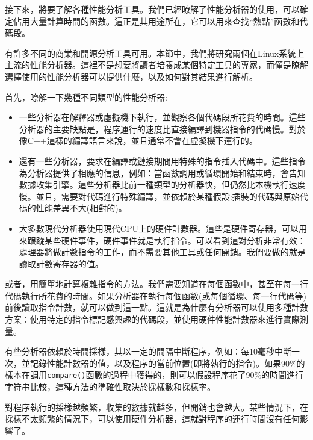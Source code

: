 
接下來，將要了解各種性能分析工具。我們已經瞭解了性能分析器的使用，可以確定佔用大量計算時間的函數。這正是其用途所在，它可以用來查找“熱點”函數和代碼段。

有許多不同的商業和開源分析工具可用。本節中，我們將研究兩個在Linux系統上主流的性能分析器。這裡不是想要將讀者培養成某個特定工具的專家，而僅是瞭解選擇使用的性能分析器可以提供什麼，以及如何對其結果進行解析。

首先，瞭解一下幾種不同類型的性能分析器:

\begin{itemize}
\item 一些分析器在解釋器或虛擬機下執行，並觀察各個代碼段所花費的時間。這些分析器的主要缺點是，程序運行的速度比直接編譯到機器指令的代碼慢。對於像C++這樣的編譯語言來說，並且通常不會在虛擬機下運行的。

\item 還有一些分析器，要求在編譯或鏈接期間用特殊的指令插入代碼中。這些指令為分析器提供了相應的信息，例如：當函數調用或循環開始和結束時，會告知數據收集引擎。這些分析器比前一種類型的分析器快，但仍然比本機執行速度慢。並且，需要對代碼進行特殊編譯，並依賴於某種假設:插裝的代碼與原始代碼的性能差異不大(相對的)。

\item 大多數現代分析器使用現代CPU上的硬件計數器。這些是硬件寄存器，可以用來跟蹤某些硬件事件，硬件事件就是執行指令。可以看到這對分析非常有效：處理器將做計數指令的工作，而不需要其他工具或任何開銷。我們要做的就是讀取計數寄存器的值。

\end{itemize}

或者，用簡單地計算複雜指令的方法。我們需要知道在每個函數中，甚至在每一行代碼執行所花費的時間。如果分析器在執行每個函數(或每個循環、每一行代碼等)前後讀取指令計數，就可以做到這一點。這就是為什麼有分析器可以使用多種計數方案：使用特定的指令標記感興趣的代碼段，並使用硬件性能計數器來進行實際測量。

有些分析器依賴於時間採樣，其以一定的間隔中斷程序，例如：每10毫秒中斷一次，並記錄性能計數器的值，以及程序的當前位置(即將執行的指令)。如果90\%的樣本在調用\texttt{compare()}函數的過程中獲得的，則可以假設程序花了90\%的時間進行字符串比較，這種方法的準確性取決於採樣數和採樣率。

對程序執行的採樣越頻繁，收集的數據就越多，但開銷也會越大。某些情況下，在採樣不太頻繁的情況下，可以使用硬件分析器，這就對程序的運行時間沒有任何影響了。


